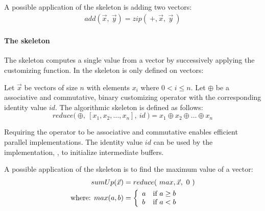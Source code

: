 A possible application of the \zip skeleton is adding two vectors:
\begin{align*}
  add(\vec{x},\ \vec{y}) = zip(\ +, \vec{x},\ \vec{y}\ )
\end{align*}


\paragraph{The \reduce skeleton}
The \reduce skeleton computes a single value from a vector by successively applying the customizing function.
In \SkelCL the \reduce skeleton is only defined on vectors:
\begin{definition}
  \label{definition:reduce}
  Let $\vec{x}$ be vectors of size $n$ with elements $x_i$ where $0 < i \leq n$.
  Let $\oplus$ be a associative and commutative, binary customizing operator with the corresponding identity value $id$.
  The algorithmic skeleton \reduce is defined as follows:
  \begin{equation}
    reduce \big(\ \oplus,\ [x_1, x_2, \dots, x_n],\ id\ \big)
      = x_1 \oplus x_2 \oplus \dots \oplus x_n
  \end{equation}
\end{definition}
\noindent
Requiring the operator to be associative and commutative enables efficient parallel implementations.
The identity value $id$ can be used by the implementation, \eg, to initialize intermediate buffers. %

A possible application of the \reduce skeleton is to find the maximum value of a vector:
\begin{align*}
  sumUp(\vec{x}) &= reduce(\ max, \vec{x},\ 0\ )\\
  \text{where: } max(a, b) &=
    \left\{
      \begin{array}{l l}
      a & \text{if } a \geq b\\
      b & \text{if } a < b
      \end{array}
    \right.
\end{align*}


